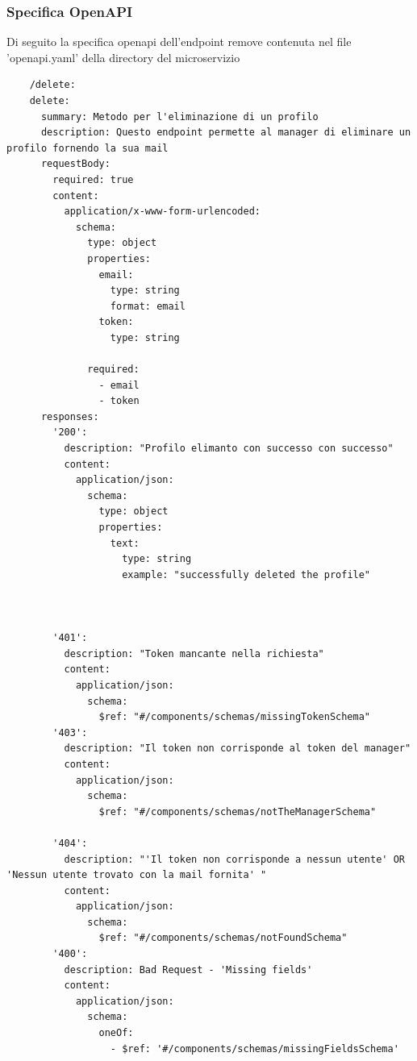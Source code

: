 \documentclass{report}
\begin{document}
\subsubsection*{Specifica OpenAPI}
Di seguito la specifica openapi dell'endpoint remove contenuta nel file 'openapi.yaml' della directory del microservizio
\begin{verbatim}
	/delete:
    delete:
      summary: Metodo per l'eliminazione di un profilo
      description: Questo endpoint permette al manager di eliminare un profilo fornendo la sua mail
      requestBody:
        required: true
        content:
          application/x-www-form-urlencoded:
            schema:
              type: object
              properties:
                email:
                  type: string
                  format: email
                token:
                  type: string
               
              required:
                - email
                - token
      responses:
        '200':
          description: "Profilo elimanto con successo con successo"
          content:
            application/json:
              schema:
                type: object
                properties:
                  text:
                    type: string
                    example: "successfully deleted the profile"
                  
            

        '401':
          description: "Token mancante nella richiesta"
          content:
            application/json:
              schema:
                $ref: "#/components/schemas/missingTokenSchema"
        '403':
          description: "Il token non corrisponde al token del manager"
          content:
            application/json:
              schema:
                $ref: "#/components/schemas/notTheManagerSchema"

        '404':
          description: "'Il token non corrisponde a nessun utente' OR 'Nessun utente trovato con la mail fornita' "
          content:
            application/json:
              schema:
                $ref: "#/components/schemas/notFoundSchema"
        '400':
          description: Bad Request - 'Missing fields' 
          content:
            application/json:
              schema:
                oneOf:
                  - $ref: '#/components/schemas/missingFieldsSchema'
     
\end{verbatim}
\end{document}
